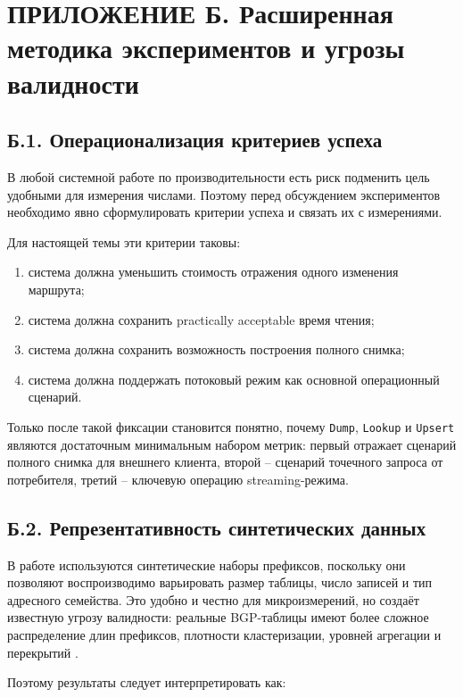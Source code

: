 \section*{ПРИЛОЖЕНИЕ Б. Расширенная методика экспериментов и угрозы валидности}

\subsection*{Б.1. Операционализация критериев успеха}

В любой системной работе по производительности есть риск подменить
цель удобными для измерения числами. Поэтому перед обсуждением
экспериментов необходимо явно сформулировать критерии успеха и
связать их с измерениями.

Для настоящей темы эти критерии таковы:

\begin{enumerate}
\item система должна уменьшить стоимость отражения одного изменения
маршрута;
\item система должна сохранить practically acceptable время чтения;
\item система должна сохранить возможность построения полного снимка;
\item система должна поддержать потоковый режим как основной
операционный сценарий.
\end{enumerate}

Только после такой фиксации становится понятно, почему \texttt{Dump},
\texttt{Lookup} и \texttt{Upsert} являются достаточным минимальным
набором метрик: первый отражает сценарий полного снимка для внешнего
клиента, второй -- сценарий точечного запроса от потребителя,
третий -- ключевую операцию streaming-режима.

\subsection*{Б.2. Репрезентативность синтетических данных}

В работе используются синтетические наборы префиксов, поскольку они
позволяют воспроизводимо варьировать размер таблицы, число записей и
тип адресного семейства. Это удобно и честно для микроизмерений, но
создаёт известную угрозу валидности: реальные BGP-таблицы имеют более
сложное распределение длин префиксов, плотности кластеризации,
уровней агрегации и перекрытий
\cite{labovitz1997instability,labovitz2000convergence}.

Поэтому результаты следует интерпретировать как:

